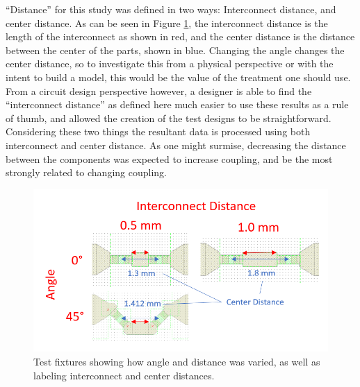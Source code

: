 \documentclass[12pt]{usfcoe}
\begin{document}
    ``Distance'' for this study was defined in two ways: Interconnect distance, and center distance.
    As can be seen in Figure \ref{fig:treatment_explanation}, the interconnect distance is the length of the interconnect as shown in red, and the center distance is the distance between the center of the parts, shown in blue.
    Changing the angle changes the center distance, so to investigate this from a physical perspective or with the intent to build a model, this would be the value of the treatment one should use.
    From a circuit design perspective however, a designer is able to find the ``interconnect distance'' as defined here much easier to use these results as a rule of thumb, and allowed the creation of the test designs to be straightforward. 
    Considering these two things the resultant data is processed using both interconnect and center distance.
    As one might surmise, decreasing the distance between the components was expected to increase coupling, and be the most strongly related to changing coupling.
    
    \begin{figure}[H]
		\begin{center}
        	\includegraphics[width=\textwidth]{images/ANOVA/treatment_explanations.png} 
			\caption{Test fixtures showing how angle and distance was varied, as well as labeling interconnect and center distances.} 
			\label{fig:treatment_explanation}
		\end{center}
	\end{figure}    
	
\end{document}
